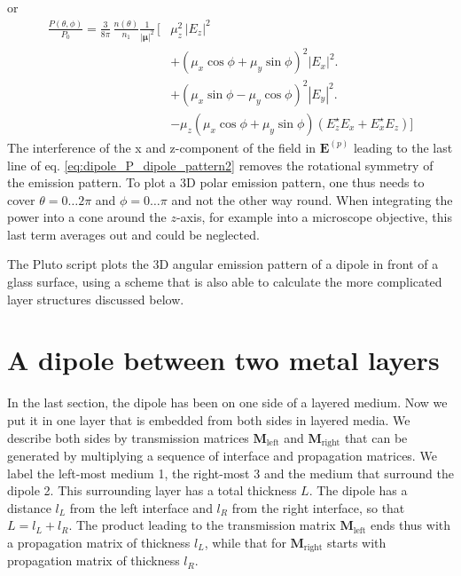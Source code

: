 or 
\begin{align} \label{eq:dipole_P_dipole_pattern2}
  \frac{P(\theta, \phi)}{P_0} = 
  \frac{3}{8 \pi} \, \frac{n(\theta)}{n_1} \frac{1}{|\mathbf{\mu}|^2} \, 
  \biggl[ 
  & \mu_z^2 \, | E_z | ^2   \\
  & + ( \mu_x \cos \phi + \mu_y \sin \phi)^2 | E_x | ^2  \biggl. \nonumber \\
  & + ( \mu_x \sin \phi - \mu_y \cos \phi)^2 | E_y | ^2 \biggl. \nonumber \\
  &  - \mu_z ( \mu_x \cos \phi + \mu_y \sin \phi) ( E_z^\star E_x + E_x^\star E_z)  \biggr] \nonumber 
  \end{align}
The interference of the x and z-component of the field in $\mathbf{E}^{(p)}$ leading to  the last line of eq. \ref{eq:dipole_P_dipole_pattern2} removes the rotational symmetry of  the emission pattern. To plot a 3D polar emission pattern, one thus needs to cover $\theta = 0 \dots 2 \pi$ and $\phi = 0 \dots \pi$ and not the other way round. When integrating the power into a cone around the $z$-axis, for example into a microscope objective, this last term averages out and could be neglected.

The Pluto script plots the 3D angular emission pattern of a dipole in front of a glass surface, using a scheme that is also able to calculate the more complicated layer structures discussed below.



\section{A dipole between two metal layers}


In the last section, the dipole has been on one side of a layered medium. Now we put it in one layer that is embedded from both sides in layered media. We describe both sides by transmission matrices $\mathbf{M}_\text{left}$ and $\mathbf{M}_\text{right}$ that can be generated by multiplying  a sequence of interface and propagation matrices. We label the left-most medium 1, the right-most 3 and the medium that surround the dipole 2. This surrounding layer has a total thickness $L$. The dipole has a distance $l_L$ from the left interface and $l_R$ from the right interface, so that $L = l_L + l_R$. The product leading to the  transmission matrix $\mathbf{M}_\text{left}$ ends thus with a propagation matrix of thickness $l_L$, while that for  $\mathbf{M}_\text{right}$ starts with propagation matrix of thickness $l_R$.



